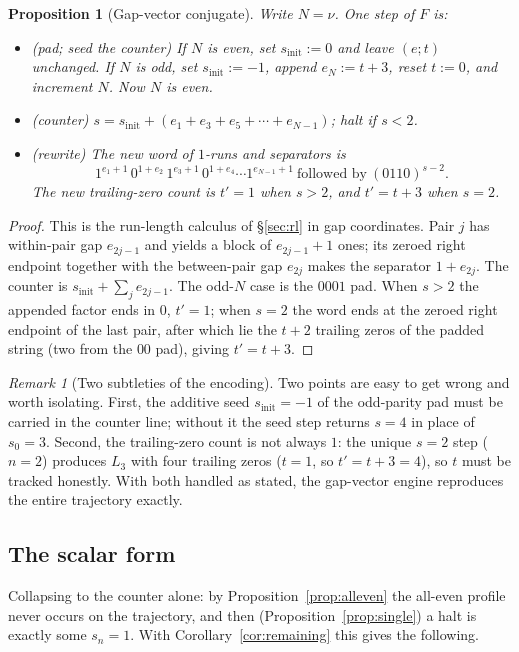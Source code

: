 \documentclass[11pt,reqno]{amsart}
\theoremstyle{plain}
\newtheorem{proposition}{Proposition}
\theoremstyle{definition}
\theoremstyle{remark}
\newtheorem{remark}{Remark}
\begin{document}
\begin{proposition}[Gap-vector conjugate]\label{prop:gap}
Write $N=\nu$. One step of $F$ is:
\begin{itemize}
\item (\emph{pad; seed the counter}) If $N$ is even, set $s_{\mathrm{init}}:=0$ and leave $(e;t)$ unchanged. If $N$ is odd, set $s_{\mathrm{init}}:=-1$, append $e_N:=t+3$, reset $t:=0$, and increment $N$. Now $N$ is even.
\item (\emph{counter}) $s=s_{\mathrm{init}}+(e_1+e_3+e_5+\cdots+e_{N-1})$; halt if $s<2$.
\item (\emph{rewrite}) The new word of $1$-runs and separators is
\[ 1^{e_1+1}\,0^{1+e_2}\,1^{e_3+1}\,0^{1+e_4}\cdots 1^{e_{N-1}+1}\ \text{followed by}\ (0110)^{s-2}. \]
The new trailing-zero count is $t'=1$ when $s>2$, and $t'=t+3$ when $s=2$.
\end{itemize}
\end{proposition}
\begin{proof}
This is the run-length calculus of \S\ref{sec:rl} in gap coordinates. Pair $j$ has within-pair gap $e_{2j-1}$ and yields a block of $e_{2j-1}+1$ ones; its zeroed right endpoint together with the between-pair gap $e_{2j}$ makes the separator $1+e_{2j}$. The counter is $s_{\mathrm{init}}+\sum_j e_{2j-1}$. The odd-$N$ case is the $0001$ pad. When $s>2$ the appended factor ends in $0$, $t'=1$; when $s=2$ the word ends at the zeroed right endpoint of the last pair, after which lie the $t+2$ trailing zeros of the padded string (two from the $00$ pad), giving $t'=t+3$.
\end{proof}

\begin{remark}[Two subtleties of the encoding]\label{rem:enc-subtleties}
Two points are easy to get wrong and worth isolating. First, the additive seed $s_{\mathrm{init}}=-1$ of the odd-parity pad must be carried in the counter line; without it the seed step returns $s=4$ in place of $s_0=3$. Second, the trailing-zero count is not always $1$: the unique $s=2$ step ($n=2$) produces $L_3$ with four trailing zeros ($t=1$, so $t'=t+3=4$), so $t$ must be tracked honestly. With both handled as stated, the gap-vector engine reproduces the entire trajectory exactly.
\end{remark}

\subsection{The scalar form}\label{sec:10.4}
Collapsing to the counter alone: by Proposition~\ref{prop:alleven} the all-even profile never occurs on the trajectory, and then (Proposition~\ref{prop:single}) a halt is exactly some $s_n=1$. With Corollary~\ref{cor:remaining} this gives the following.
\end{document}
